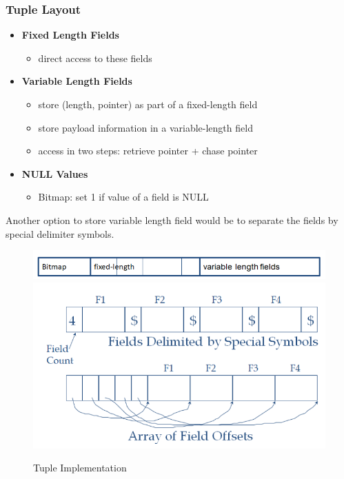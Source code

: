 \subsubsection{Tuple Layout}
\begin{itemize}
\item \textbf{Fixed Length Fields}
\begin{itemize}
\item direct access to these fields
\end{itemize}
\item \textbf{Variable Length Fields}
\begin{itemize}
\item store (length, pointer) as part of a fixed-length field
\item store payload information in a variable-length field
\item access in two steps: retrieve pointer + chase pointer
\end{itemize}
\item \textbf{NULL Values}
\begin{itemize}
\item Bitmap: set 1 if value of a field is NULL
\end{itemize}
\end{itemize}
Another option to store variable length field would be to separate the fields by special delimiter symbols.
\begin{figure}[H]
\centering
\includegraphics[width=.6\textwidth]{images/tuple_layout.PNG}
\includegraphics[width=.5\textwidth]{images/tuple_implementation.PNG}
\caption{Tuple Implementation}
\label{tuple_implementation}
\end{figure}

